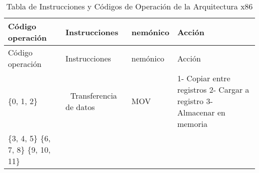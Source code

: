 \documentclass[12pt,twoside]{templates/unerthesis}
\begin{document}
\begin{longtable}[]{@{}llll@{}}
\caption{\label{tab:isacompleta}Tabla de Instrucciones y Códigos de Operación de la Arquitectura x86}\tabularnewline
\toprule
\begin{minipage}[b]{0.14\columnwidth}\raggedright
Código operación\strut
\end{minipage} & \begin{minipage}[b]{0.11\columnwidth}\raggedright
Instrucciones\strut
\end{minipage} & \begin{minipage}[b]{0.08\columnwidth}\raggedright
nemónico\strut
\end{minipage} & \begin{minipage}[b]{0.56\columnwidth}\raggedright
Acción\strut
\end{minipage}\tabularnewline
\midrule
\endfirsthead
\toprule
\begin{minipage}[b]{0.14\columnwidth}\raggedright
Código operación\strut
\end{minipage} & \begin{minipage}[b]{0.11\columnwidth}\raggedright
Instrucciones\strut
\end{minipage} & \begin{minipage}[b]{0.08\columnwidth}\raggedright
nemónico\strut
\end{minipage} & \begin{minipage}[b]{0.56\columnwidth}\raggedright
Acción\strut
\end{minipage}\tabularnewline
\midrule
\endhead
\begin{minipage}[t]{0.14\columnwidth}\raggedright
\{0, 1, 2\}\strut
\end{minipage} & \begin{minipage}[t]{0.11\columnwidth}\raggedright
🔄 Transferencia de datos\strut
\end{minipage} & \begin{minipage}[t]{0.08\columnwidth}\raggedright
MOV\strut
\end{minipage} & \begin{minipage}[t]{0.56\columnwidth}\raggedright
1- Copiar entre registros 2- Cargar a registro 3- Almacenar en memoria\strut
\end{minipage}\tabularnewline
\begin{minipage}[t]{0.14\columnwidth}\raggedright
\{3, 4, 5\} \{6, 7, 8\} \{9, 10, 11\}\strut
\end{minipage} & \begin{minipage}[t]{0.11\columnwidth}\raggedright

\end{minipage}
\end{longtable}
\end{document}
